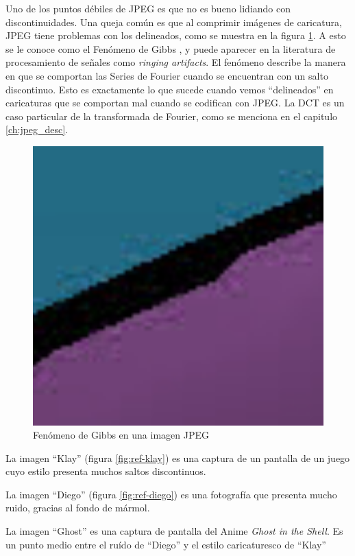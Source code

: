 Uno de los puntos débiles de JPEG es que no es bueno lidiando con
discontinuidades. Una queja común es que al comprimir imágenes de caricatura,
JPEG tiene problemas con los delineados, como se muestra en la figura
\ref{fig:gibbs}. A esto se le conoce como el Fenómeno de Gibbs \cite{gibbs}, y
puede aparecer en la literatura de procesamiento de señales como \emph{ringing
artifacts}. El fenómeno describe la manera en que se comportan las Series de
Fourier cuando se encuentran con un salto discontinuo. Esto es exactamente lo
que sucede cuando vemos ``delineados'' en caricaturas que se comportan mal
cuando se codifican con JPEG. La DCT es un caso particular de la transformada
de Fourier, como se menciona en el capitulo \ref{ch:jpeg_desc}.

\begin{figure}[b]
    \includegraphics[width=1.0\textwidth]{gibbs}
    \caption{Fenómeno de Gibbs en una imagen JPEG}
    \label{fig:gibbs}
\end{figure}

La imagen ``Klay'' (figura \ref{fig:ref-klay}) es una captura de un pantalla de
un juego cuyo estilo presenta muchos saltos discontinuos.

La imagen ``Diego'' (figura \ref{fig:ref-diego}) es una fotografía que presenta
mucho ruido, gracias al fondo de mármol.

La imagen ``Ghost'' es una captura de pantalla del Anime \emph{Ghost in the
Shell}. Es un punto medio entre el ruído de ``Diego'' y el estilo caricaturesco
de ``Klay''

